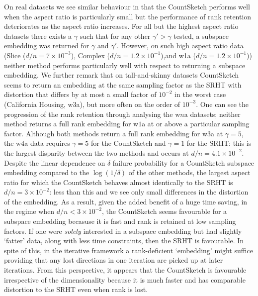 On real datasets we see similar behaviour in that the CountSketch performs well
when the aspect ratio is particularly small but the performance of rank
retention deteriorates as the aspect ratio increases.
For all but the highest aspect ratio datasets there exists a $\gamma$ such that for any
other $\gamma' > \gamma$ tested, a subspace embedding was returned for $\gamma$
and $\gamma'$.
However, on such high aspect ratio data (Slice ($d/n = 7 \times 10^{-3}$),
 Complex ($d/n=1.2 \times 10^{-1}$),and w1a ($d/n = 1.2 \times 10^{-1}$)) neither
 method performs particularly well with respect to returning a subspace embedding.
We further remark that on tall-and-skinny datasets CountSketch seems to return an
embedding at the same sampling factor as the SRHT with distortion that differs
by at most a small factor of $10^{-2}$ in the worst case (California Housing,
w3a), but more often on the order of $10^{-3}$.
One can see the progression of the rank retention through analysing the w$n$a
 datasets; neither method returns a full rank embedding for w$1$a at or above
 a particular sampling factor.
 Although both methods return a full rank embedding for w$3$a at $\gamma=5$,
 the w$4$a data requires $\gamma = 5$ for the CountSketch and $\gamma = 1$
 for the SRHT: this is the largest disparity between the two methods and occurs
 at $d/n = 4.1 \times 10^{-2}$.
 Despite the linear dependence on $\delta$ failure probability for a CountSketch
 subspace embedding compared to the $\log(1/\delta)$ of the other methods,
 the largest aspect ratio for which the CountSketch behaves almost identically
 to the SRHT is $d/n = 3 \times 10^{-2}$: less than this and we see only small
 differences in the distortion of the embedding.
 As a result, given the added benefit of a huge time saving, in the regime when
 $d/n < 3 \times 10^{-2}$, the CountSketch seems favourable for a subspace
 embedding becasuse it is fast and rank is retained at low sampling factors.
 If one were \textit{solely} interested in a subspace embedding but had
 slightly `fatter' data, along with less time constraints, then the SRHT is
 favourable.
 In spite of this, in the iterative framework a rank-deficient `embedding' might
 suffice providing that any lost directions in one iteration are picked up at
 later iterations.
 From this perspective, it appears that the CountSketch is favourable irrespective
 of the dimensionality because it is much faster and has comparable distortion
 to the SRHT even when rank is lost.

